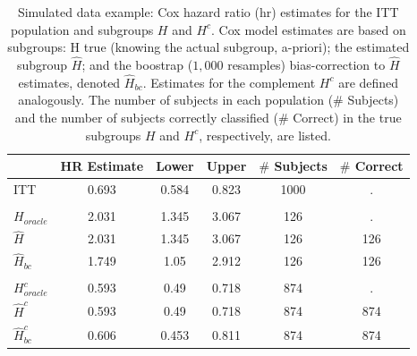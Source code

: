 \documentclass[smallextended]{svjour3}
\begin{document}
\begin{table}

\caption{\label{tab:simex_tab}\label{tab:simex} Simulated data example: Cox hazard ratio (hr) estimates for the ITT population and subgroups $H$ and $H^{c}$.
Cox model estimates are based on subgroups: H true (knowing the actual subgroup, a-priori); the estimated subgroup $\hat{H}$; and 
the boostrap ($1,000$ resamples) bias-correction to $\hat{H}$ estimates, denoted $\hat{H}_{bc}$.  Estimates for the complement $H^{c}$ are defined analogously.
The number of subjects in each population ($\#$ Subjects) and the number of subjects correctly classified ($\#$ Correct) in the true subgroups $H$ and $H^{c}$, respectively, are listed.}
\centering
\fontsize{9}{11}\selectfont
\begin{tabular}[t]{lccccc}
\toprule
  & HR Estimate & Lower & Upper & $\#$ Subjects & $\#$ Correct\\
\midrule
ITT & 0.693 & 0.584 & 0.823 & 1000 & .\\
\addlinespace[0.3em]
\multicolumn{6}{l}{\textbf{H subgroup estimates}}\\
\hspace{1em}$H_{oracle}$ & 2.031 & 1.345 & 3.067 & 126 & .\\
\hspace{1em}$\hat{H}$ & 2.031 & 1.345 & 3.067 & 126 & 126\\
\hspace{1em}$\hat{H}_{bc}$ & 1.749 & 1.05 & 2.912 & 126 & 126\\
\addlinespace[0.3em]
\multicolumn{6}{l}{\textbf{H-complement subgroup estimates}}\\
\hspace{1em}$H^{c}_{oracle}$ & 0.593 & 0.49 & 0.718 & 874 & .\\
\hspace{1em}$\hat{H}^{c}$ & 0.593 & 0.49 & 0.718 & 874 & 874\\
\hspace{1em}$\hat{H}^{c}_{bc}$ & 0.606 & 0.453 & 0.811 & 874 & 874\\
\bottomrule
\end{tabular}
\end{table}





\end{document}
